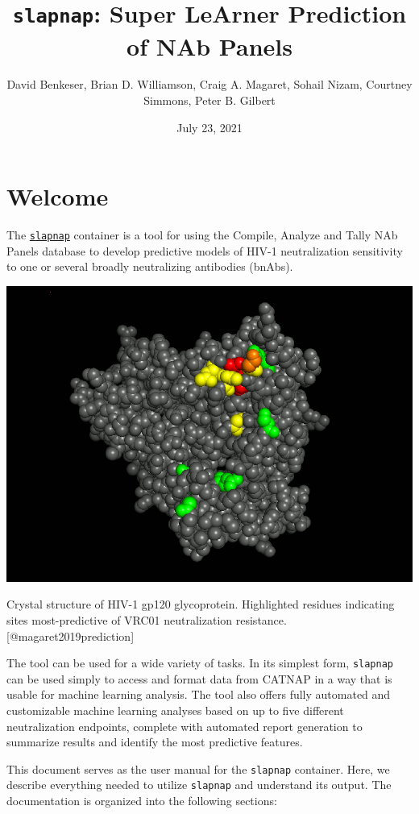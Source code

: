 \documentclass[
]{article}
\title{\texttt{slapnap}: Super LeArner Prediction of NAb Panels}
\author{David Benkeser, Brian D. Williamson, Craig A. Magaret, Sohail Nizam, Courtney Simmons, Peter B. Gilbert}
\date{July 23, 2021}
\begin{document}
\maketitle

{
\setcounter{tocdepth}{2}
\tableofcontents
}
\hypertarget{welcome}{%
\section*{Welcome}\label{welcome}}

The \href{https://hub.docker.com/r/slapnap/slapnap}{\texttt{slapnap}} container is a tool for using the Compile, Analyze and Tally NAb Panels \citep[CATNAP;][]{yoon2015catnap} database to develop predictive models of HIV-1 neutralization sensitivity to one or several broadly neutralizing antibodies (bnAbs).

\begin{center}\includegraphics[width=0.7\linewidth]{gp120} \end{center}
\begin{center}
Crystal structure of HIV-1 gp120 glycoprotein. Highlighted residues
indicating sites most-predictive of VRC01 neutralization resistance.
{[}@magaret2019prediction{]}
\end{center}

The tool can be used for a wide variety of tasks. In its simplest form, \texttt{slapnap} can be used simply to access and format data from CATNAP in a way that is usable for machine learning analysis. The tool also offers fully automated and customizable machine learning analyses based on up to five different neutralization endpoints, complete with automated report generation to summarize results and identify the most predictive features.

This document serves as the user manual for the \texttt{slapnap} container. Here, we describe everything needed to utilize \texttt{slapnap} and understand its output. The documentation is organized into the following sections:
\end{document}
